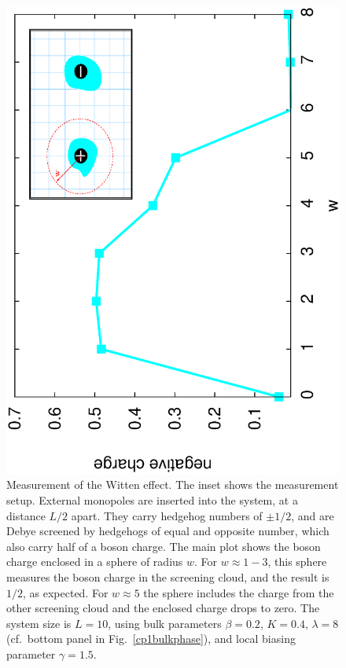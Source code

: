 \documentclass[prb,twocolumn]{revtex4-1}
\newcommand{\scripty}[1]{w}
\begin{document}
\begin{figure}
\includegraphics[angle=-90,width=\linewidth]{figures/wittenout.eps}
\caption{Measurement of the Witten effect. The inset shows the measurement setup. External monopoles are inserted into the system, at a distance $L/2$ apart. They carry hedgehog numbers of $\pm 1/2$, and are Debye screened by hedgehogs of equal and opposite number, which also carry half of a boson charge. The main plot shows the boson charge enclosed in a sphere of radius $\scripty{r}$. For $\scripty{r}\approx 1-3$, this sphere measures the boson charge in the screening cloud, and the result is $1/2$, as expected. For $\scripty{r}\approx 5$ the sphere includes the charge from the other screening cloud and the enclosed charge drops to zero. The system size is $L=10$, using bulk parameters $\beta=0.2$, $K=0.4$, $\lambda=8$ (cf.~bottom panel in Fig.~\ref{cp1bulkphase}), and local biasing parameter $\gamma=1.5$.}
\label{witten}
\end{figure}
\end{document}
